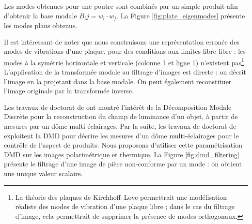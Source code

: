 Les modes obtenues pour une poutre sont combinés par un simple produit afin d'obtenir la base modale $B_ij = w_i \cdot w_j$.
La Figure \ref{fig:plate_eigenmodes} présente les modes plans obtenus.

Il est intéressant de noter que nous construisons une représentation erronée des modes de vibrations d'une plaque, pour des conditions aux limites libre-libre : les modes à la symétrie horizontale et verticale (colonne 1 et ligne 1) n'existent pas\footnote{La théorie des plaques de Kirchhoff–Love permettrait une modélisation réaliste des modes de vibration d'une plaque libre ; dans le cas du filtrage d'image, cela permettrait de supprimer la présence de modes orthogonaux.}.
L'application de la transformée modale au filtrage d'images est directe : on décrit l'image en la projetant dans la base modale.
On peut également reconstituer l'image originale par la transformée inverse.

Les travaux de doctorat de \citeauthor{pitard_metrologie_2016} \cite{pitard_metrologie_2016} ont montré l'intérêt de la Décomposition Modale Discrète pour la reconstruction du champ de luminance d'un objet, à partir de mesures par un dôme multi-éclairages.
Par la suite, les travaux de doctorat de \citeauthor{lacombe_exploitation_2018a} \cite{lacombe_exploitation_2018a} exploitent la DMD pour décrire les mesures d'un dôme multi-éclairages pour le contrôle de l'aspect de produits.
Nous proposons d'utiliser cette paramétrisation DMD sur les images polarimétrique et thermique.
La Figure \ref{fig:dmd_filtering} présente le filtrage d'une image de pièce non-conforme par un mode : on obtient une unique valeur scalaire.


